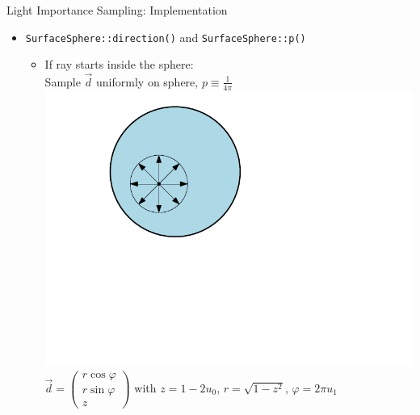 \documentclass[utf8,stillsansserifmath,fleqn,t]{beamer}
\newcommand{\code}[1]{\texttt{#1}}
\begin{document}
\begin{frame}
\frametitle{\insertsection}
Light Importance Sampling: Implementation
\begin{itemize}
\item \code{SurfaceSphere::direction()} and \code{SurfaceSphere::p()}
    \begin{itemize}
    \item If ray starts inside the sphere:\\
        Sample $\vec{d}$ uniformly on sphere, $p\equiv \frac{1}{4\pi}$\\
        \includegraphics[width=.5\textwidth]{./fig/direction-to-sphere-inside.pdf}\\
        $\vec{d} = \begin{pmatrix}r\cos\varphi \\ r\sin\varphi \\ z\end{pmatrix}$
        with $z = 1-2u_0$, $r=\sqrt{1-z^2}$, $\varphi=2\pi u_1$
    \end{itemize}
\end{itemize}
\end{frame}
\end{document}
